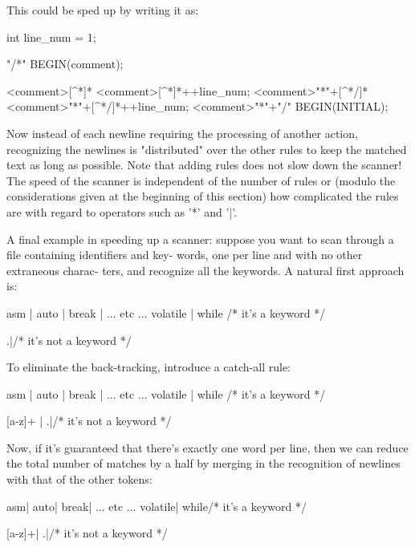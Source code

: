 \documentclass[12pt,spanish,twocolumn,lettersize]{article}
\begin{document}
{       This could be sped up by writing it as:

		   int line_num = 1;

	   "/*"		BEGIN(comment);

	   <comment>[^*\n]*
	   <comment>[^*\n]*\n	   ++line_num;
	   <comment>"*"+[^*/\n]*
	   <comment>"*"+[^*/\n]*\n ++line_num;
	   <comment>"*"+"/"	   BEGIN(INITIAL);

       Now instead of each newline requiring  the  processing  of
       another	action, recognizing the newlines is "distributed"
       over the other rules to keep the matched text as	 long  as
       possible.   Note	 that adding rules does not slow down the
       scanner!	 The speed of the scanner is independent  of  the
       number of rules or (modulo the considerations given at the
       beginning of this section) how complicated the  rules  are
       with regard to operators such as '*' and '|'.

       A final example in speeding up a scanner: suppose you want
       to scan through a file  containing  identifiers	and  key-
       words,  one  per line and with no other extraneous charac-
       ters, and recognize all the  keywords.	A  natural  first
       approach is:

	   asm	    |
	   auto	    |
	   break    |
	   ... etc ...
	   volatile |
	   while    /* it's a keyword */

	   .|\n	    /* it's not a keyword */

       To  eliminate  the  back-tracking,  introduce  a catch-all
       rule:

	   asm	    |
	   auto	    |
	   break    |
	   ... etc ...
	   volatile |
	   while    /* it's a keyword */

	   [a-z]+   |
	   .|\n	    /* it's not a keyword */

       Now, if it's guaranteed that there's exactly one word  per
       line,  then we can reduce the total number of matches by a
       half by merging in the recognition of newlines  with  that
       of the other tokens:

	   asm\n    |
	   auto\n   |
	   break\n  |
	   ... etc ...
	   volatile\n |
	   while\n  /* it's a keyword */

	   [a-z]+\n |
	   .|\n	    /* it's not a keyword */

}
\end{document}
